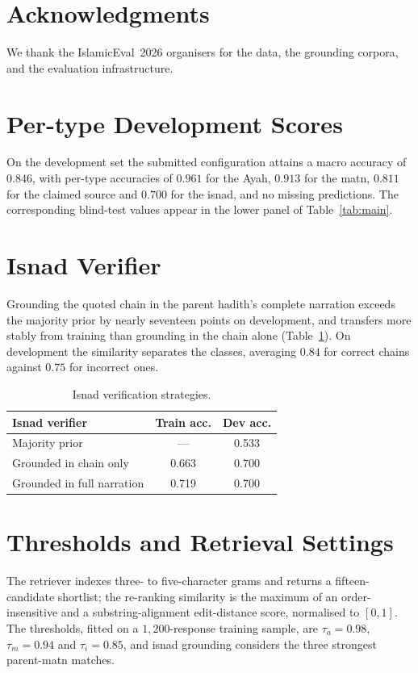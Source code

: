 \documentclass[11pt]{article}
\begin{document}
\section*{Acknowledgments}
We thank the IslamicEval~2026 organisers for the data, the grounding corpora, and the evaluation
infrastructure.
\label{endofbody}



\appendix

\section{Per-type Development Scores}
\label{app:pertype}
On the development set the submitted configuration attains a macro accuracy of $0.846$, with per-type
accuracies of $0.961$ for the Ayah, $0.913$ for the matn, $0.811$ for the claimed source and $0.700$
for the isnad, and no missing predictions. The corresponding blind-test values appear in the lower
panel of Table~\ref{tab:main}.

\section{Isnad Verifier}
\label{app:isnad}
Grounding the quoted chain in the parent hadith's complete narration exceeds the majority prior by
nearly seventeen points on development, and transfers more stably from training than grounding in the
chain alone (Table~\ref{tab:isnad}). On development the similarity separates the classes, averaging
$0.84$ for correct chains against $0.75$ for incorrect ones.

\begin{table}[h]
\centering\small
\setlength{\tabcolsep}{4pt}
\begin{tabular}{lcc}
\toprule
\textbf{Isnad verifier} & \textbf{Train acc.} & \textbf{Dev acc.} \\
\midrule
Majority prior & --- & 0.533 \\
Grounded in chain only & 0.663 & 0.700 \\
Grounded in full narration & 0.719 & 0.700 \\
\bottomrule
\end{tabular}
\caption{Isnad verification strategies.}
\label{tab:isnad}
\end{table}

\section{Thresholds and Retrieval Settings}
\label{app:hparams}
The retriever indexes three- to five-character grams and returns a fifteen-candidate shortlist; the
re-ranking similarity is the maximum of an order-insensitive and a substring-alignment edit-distance
score, normalised to $[0,1]$. The thresholds, fitted on a $1{,}200$-response training sample, are
$\tau_a=0.98$, $\tau_m=0.94$ and $\tau_i=0.85$, and isnad grounding considers the three strongest
parent-matn matches.
\end{document}
